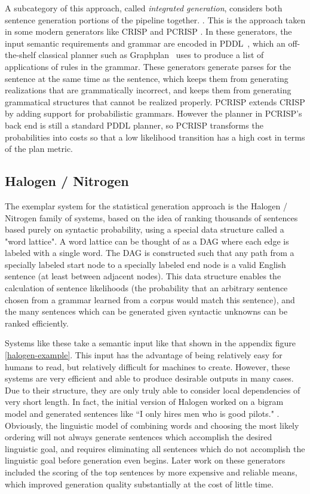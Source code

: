 A subcategory of this approach, called {\em integrated generation}, considers both
sentence generation portions of the pipeline together.
\cite{koller_sentence_2007}.  This is the approach taken in some
modern generators like CRISP \cite{koller_sentence_2007} and PCRISP
\cite{bauer_sentence_2010}.  In these generators, the input semantic
requirements and grammar are encoded in PDDL~\cite{fox2003pddl2},
which an off-the-shelf classical planner such as
Graphplan~\cite{blum_1997_graphplan} uses to produce a list of
applications of rules in the grammar.  These generators generate
parses for the sentence at the same time as the sentence, which keeps
them from generating realizations that are grammatically incorrect,
and keeps them from generating grammatical structures that cannot be
realized properly. PCRISP extends CRISP by adding support for
probabilistic grammars. However the planner in PCRISP's back end is
still a standard PDDL planner, so PCRISP transforms the probabilities
into costs so that a low likelihood transition has a high cost in
terms of the plan metric.

\subsection{Halogen / Nitrogen}

The exemplar system for the statistical generation approach is the
Halogen / Nitrogen family of systems, based on the idea of
ranking thousands of sentences based purely on syntactic probability,
using a special data structure called a "word lattice".
A word lattice can be thought of as a DAG where each edge is
labeled with a single word.  The DAG is constructed such that
any path from a specially labeled start node to a specially labeled
end node is a valid English sentence (at least between adjacent nodes).
This data structure enables the calculation of sentence likelihoods
(the probability that an arbitrary sentence chosen from a grammar
learned from a corpus would match this sentence), and the many
sentences which can be generated
given syntactic unknowns can be ranked efficiently.

Systems like these take a semantic input like that shown in
the appendix figure \ref{halogen-example}.  This input
has the advantage of being relatively easy for humans to
read, but relatively difficult for machines to create.
However, these systems are very efficient and able
to produce desirable outputs in many cases.  Due to
their structure, they are only truly able to consider local
dependencies of very short length.  In fact, the
initial version of Halogen worked on a bigram model
and generated sentences like ``I only hires men who is good 
pilots." \cite{knight_1995_genselect}.  Obviously, the
linguistic model of combining words and choosing the most likely
ordering will not always generate sentences which accomplish
the desired linguistic goal, and requires eliminating all
sentences which do not accomplish the linguistic goal
before generation even begins.  Later work on these
generators included the scoring of the top
sentences by more expensive and reliable means, which
improved generation quality substantially at the cost of
little time. \cite{langkilde1998generation}

